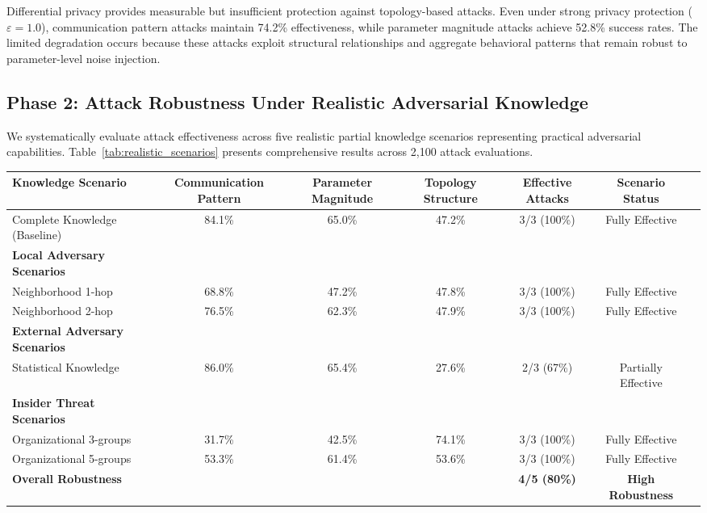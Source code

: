 Differential privacy provides measurable but insufficient protection against topology-based attacks. Even under strong privacy protection ($\varepsilon = 1.0$), communication pattern attacks maintain 74.2\% effectiveness, while parameter magnitude attacks achieve 52.8\% success rates. The limited degradation occurs because these attacks exploit structural relationships and aggregate behavioral patterns that remain robust to parameter-level noise injection.

\subsection{Phase 2: Attack Robustness Under Realistic Adversarial Knowledge}

We systematically evaluate attack effectiveness across five realistic partial knowledge scenarios representing practical adversarial capabilities. Table~\ref{tab:realistic_scenarios} presents comprehensive results across 2,100 attack evaluations.

\begin{table*}[!t]
\caption{Attack Effectiveness Under Realistic Partial Topology Knowledge Scenarios}
\label{tab:realistic_scenarios}
\centering
\footnotesize
\setlength{\tabcolsep}{6pt}
\begin{tabular}{@{}lcccccc@{}}
\toprule
\textbf{Knowledge Scenario} & \textbf{Communication Pattern} & \textbf{Parameter Magnitude} & \textbf{Topology Structure} & \textbf{Effective Attacks} & \textbf{Scenario Status} \\
\midrule
Complete Knowledge (Baseline) & 84.1\% & 65.0\% & 47.2\% & 3/3 (100\%) & Fully Effective \\
\midrule
\textbf{Local Adversary Scenarios} & & & & & \\
Neighborhood 1-hop & 68.8\% & 47.2\% & 47.8\% & 3/3 (100\%) & Fully Effective \\
Neighborhood 2-hop & 76.5\% & 62.3\% & 47.9\% & 3/3 (100\%) & Fully Effective \\
\midrule
\textbf{External Adversary Scenarios} & & & & & \\
Statistical Knowledge & 86.0\% & 65.4\% & 27.6\% & 2/3 (67\%) & Partially Effective \\
\midrule
\textbf{Insider Threat Scenarios} & & & & & \\
Organizational 3-groups & 31.7\% & 42.5\% & 74.1\% & 3/3 (100\%) & Fully Effective \\
Organizational 5-groups & 53.3\% & 61.4\% & 53.6\% & 3/3 (100\%) & Fully Effective \\
\midrule
\textbf{Overall Robustness} & & & & \textbf{4/5 (80\%)} & \textbf{High Robustness} \\
\bottomrule
\end{tabular}
\end{table*}

